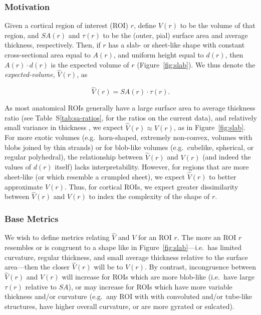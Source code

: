 \documentclass{article}
\begin{document}
\subsubsection{Motivation}

Given a cortical region of interest (ROI) \(r\), define \(V(r)\) to be the
volume of that region, and \(SA(r)\) and \(\tau(r)\) to be the (outer, pial)
surface area and average thickness, respectively. Then, if \(r\) has a slab-
or sheet-like shape with constant cross-sectional area equal to \(A(r)\), and
uniform height equal to \(d(r)\), then \(A(r) \cdot d(r)\) is the expected
volume of \(r\) (Figure~\ref{fig:slab}). We thus denote the
\emph{expected-volume}, \(\hat{V}(r)\), as

\begin{equation}
\hat{V}(r) = SA(r) \cdot \tau(r).
\end{equation}

As most anatomical ROIs generally have a large surface area to average
thickness ratio (see Table~S\ref{tab:sa-ratios}, for the ratios on the
current data), and relatively small variance in thickness
\citep{imBrainSizeCortical2008}, we expect \(\hat{V}(r) \approx V(r)\), as
in Figure~\ref{fig:slab}. For more exotic volumes (e.g.\ horn-shaped,
extremely non-convex, volumes with blobs joined by thin strands) or for
blob-like volumes (e.g.\ cubelike, spherical, or regular polyhedral), the
relationship between \(\hat{V}(r)\) and \(V(r)\) (and indeed the values of
\(d(r)\) itself) lacks interpretability. However, for regions that are more
sheet-like (or which resemble a crumpled sheet), we expect \(\hat{V}(r)\) to
better approximate \(V(r)\). Thus, for cortical ROIs, we expect
greater dissimilarity between \(\hat{V}(r)\) and \(V(r)\) to index the
complexity of the shape of \(r\).


\subsubsection{Base Metrics}

We wish to define metrics relating \(\hat{V}\) and \(V\) for an ROI  \(r\).
The more an ROI \(r\) resembles or is congruent to a shape like in
Figure~\ref{fig:slab}---i.e.\ has limited curvature, regular thickness, and
small average thickness relative to the surface area---then the closer
\(\hat{V}(r)\) will be to \(V(r)\). By contrast, incongruence between
\(\hat{V}(r)\) and \(V(r)\) will increase for ROIs which are more blob-like
(i.e.\ have large \(\tau(r)\) relative to \(SA\)), or may increase for ROIs
which have more variable thickness and/or curvature (e.g.\ any ROI with with
convoluted and/or tube-like structures, have higher overall curvature, or are
more gyrated or sulcated).
\end{document}
